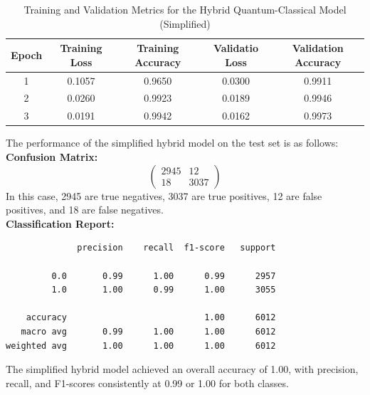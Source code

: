 \documentclass[10pt]{article}
\begin{document}
\begin{table}[H]
    \centering
    \caption{Training and Validation Metrics for the Hybrid Quantum-Classical Model (Simplified)}
    \label{tab:hybrid_simplified_model_metrics}
    \begin{tabular}{|c|c|c|c|c|}
        \hline
        \textbf{Epoch} & \textbf{Training Loss} & \textbf{Training Accuracy} & \textbf{Validatio Loss} & \textbf{Validation Accuracy} \\
        \hline
        1 & 0.1057 & 0.9650 & 0.0300 & 0.9911 \\
        2 & 0.0260 & 0.9923 & 0.0189 & 0.9946 \\
        3 & 0.0191 & 0.9942 & 0.0162 & 0.9973 \\
        \hline
    \end{tabular}
\end{table}

\noindent The performance of the simplified hybrid model on the test set is as follows:\\
\textbf{Confusion Matrix:}
    \[
    \begin{pmatrix}
    2945 & 12 \\
    18 & 3037
    \end{pmatrix}
    \]
In this case, 2945 are true negatives, 3037 are true positives, 12 are false positives, and 18 are false negatives. \\
\textbf{Classification Report:}
\begin{verbatim}
              precision    recall  f1-score   support

         0.0       0.99      1.00      0.99      2957
         1.0       1.00      0.99      1.00      3055

    accuracy                           1.00      6012
   macro avg       0.99      1.00      1.00      6012
weighted avg       1.00      1.00      1.00      6012
\end{verbatim}

\noindent The simplified hybrid model achieved an overall accuracy of 1.00, with precision, recall, and F1-scores consistently at 0.99 or 1.00 for both classes. \\
\end{document}
